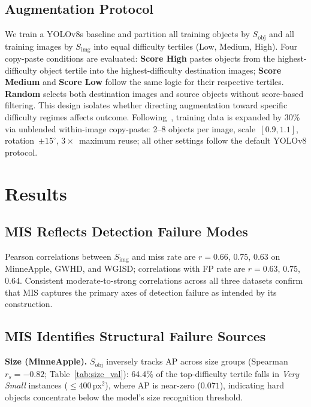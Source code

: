 \documentclass[conference]{IEEEtran}
\begin{document}
\subsection{Augmentation Protocol}
We train a YOLOv8s baseline and partition all training objects by
$S_{\mathrm{obj}}$ and all training images by $S_{\mathrm{img}}$ into
equal difficulty tertiles (Low, Medium, High).
Four copy-paste conditions are evaluated:
\textbf{Score High} pastes objects from the highest-difficulty object
tertile into the highest-difficulty destination images;
\textbf{Score Medium} and \textbf{Score Low} follow the same logic
for their respective tertiles.
\textbf{Random} selects both destination images and source objects
without score-based filtering.
This design isolates whether directing augmentation toward specific
difficulty regimes affects outcome.
Following~\cite{kisantal2019augmentation}, training data is expanded
by 30\% via unblended within-image copy-paste: 2--8 objects per
image, scale~$[0.9,1.1]$, rotation~$\pm15^\circ$,
$3{\times}$~maximum reuse; all other settings follow the default
YOLOv8 protocol.


\section{Results}
\subsection{MIS Reflects Detection Failure Modes}

Pearson correlations between $S_{\mathrm{img}}$ and miss rate are
$r{=}0.66$, $0.75$, $0.63$ on MinneApple, GWHD, and WGISD;
correlations with FP rate are $r{=}0.63$, $0.75$, $0.64$.
Consistent moderate-to-strong correlations across all three datasets
confirm that MIS captures the primary axes of detection failure as
intended by its construction.

\subsection{MIS Identifies Structural Failure Sources}

\textbf{Size (MinneApple).}
$S_{\mathrm{obj}}$ inversely tracks AP across size groups
(Spearman~$r_s{=}{-}0.82$; Table~\ref{tab:size_val}):
64.4\% of the top-difficulty tertile falls in \textit{Very Small}
instances (${\le}400$\,px$^2$), where AP is near-zero ($0.071$),
indicating hard objects concentrate below the model's size recognition
threshold.
\end{document}
